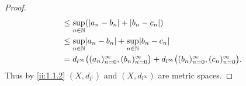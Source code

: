 \begin{proof}
\begin{align*}
                                                                     & \leq \sup_{n \in \N} (\abs{a_n - b_n} + \abs{b_n - c_n})                                                                               \\
                                                                     & \leq \sup_{n \in \N} \abs{a_n - b_n} + \sup_{n \in \N} \abs{b_n - c_n}                                                                 \\
                                                                     & = d_{l^\infty}\big((a_n)_{n = 0}^\infty, (b_n)_{n = 0}^\infty\big) + d_{l^\infty}\big((b_n)_{n = 0}^\infty, (c_n)_{n = 0}^\infty\big).
  \end{align*}
  Thus by \cref{ii:1.1.2} \((X, d_{l^1})\) and \((X, d_{l^\infty})\) are metric spaces.


\end{proof}
